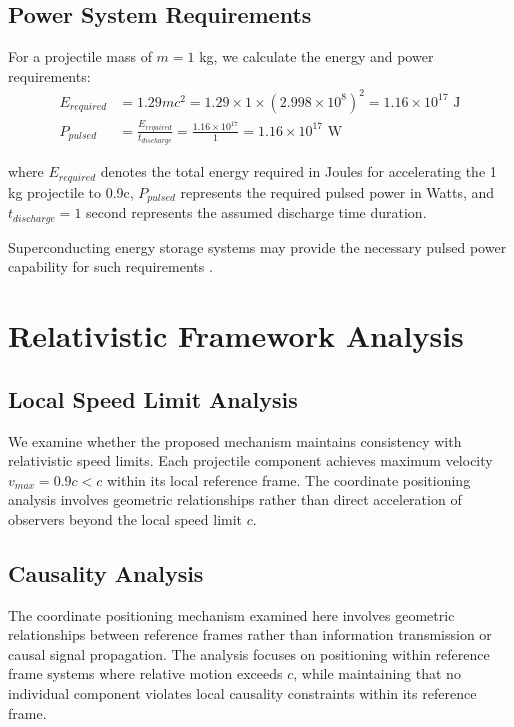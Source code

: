 \documentclass[12pt,a4paper]{article}
\begin{document}
\subsection{Power System Requirements}

For a projectile mass of $m = 1$ kg, we calculate the energy and power requirements:
\begin{align}
E_{required} &= 1.29mc^2 = 1.29 \times 1 \times (2.998 \times 10^8)^2 = 1.16 \times 10^{17} \text{ J} \\
P_{pulsed} &= \frac{E_{required}}{t_{discharge}} = \frac{1.16 \times 10^{17}}{1} = 1.16 \times 10^{17} \text{ W}
\end{align}

where $E_{required}$ denotes the total energy required in Joules for accelerating the 1 kg projectile to 0.9c, $P_{pulsed}$ represents the required pulsed power in Watts, and $t_{discharge} = 1$ second represents the assumed discharge time duration.

Superconducting energy storage systems may provide the necessary pulsed power capability for such requirements \cite{orlando1991}.

\section{Relativistic Framework Analysis}

\subsection{Local Speed Limit Analysis}

We examine whether the proposed mechanism maintains consistency with relativistic speed limits. Each projectile component achieves maximum velocity $v_{max} = 0.9c < c$ within its local reference frame. The coordinate positioning analysis involves geometric relationships rather than direct acceleration of observers beyond the local speed limit $c$.

\subsection{Causality Analysis}

The coordinate positioning mechanism examined here involves geometric relationships between reference frames rather than information transmission or causal signal propagation. The analysis focuses on positioning within reference frame systems where relative motion exceeds $c$, while maintaining that no individual component violates local causality constraints within its reference frame.
\end{document}
